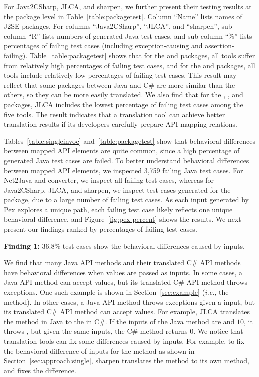 For Java2CSharp, JLCA, and sharpen, we further present their testing results at the package level in Table~\ref{table:packagetest}. Column ``Name'' lists names of J2SE packages. For columns ``Java2CSharp'', ``JLCA'', and ``sharpen'', sub-column ``R'' lists numbers of generated Java test cases, and sub-column ``\%'' lists percentages of failing test cases (including exception-causing and assertion-failing). Table~\ref{table:packagetest} shows that for the  and  packages, all tools suffer from relatively high percentages of failing test cases, and for the  and  packages, all tools include relatively low percentages of failing test cases. This result may reflect that some packages between Java and C\# are more similar than the others, so they can be more easily translated. We also find that for the , , and  packages, JLCA includes the lowest percentage of failing test cases among the five tools. The result indicates that a translation tool can achieve better translation results if its developers carefully prepare API mapping relations.

Tables~\ref{table:singleinvoc} and~\ref{table:packagetest} show that behavioral differences between mapped API elements are quite common, since a high percentage of generated Java test cases are failed. To better understand behavioral differences between mapped API elements, we inspected 3,759 failing Java test cases. For Net2Java and converter, we inspect all failing test cases, whereas for Java2CSharp, JLCA, and sharpen, we inspect test cases generated for the  package, due to a large number of failing test cases. As each input generated by Pex explores a unique path, each failing test case likely reflects one unique behavioral difference, and Figure~\ref{fig:pex-percent} shows the results. We next present our findings ranked by percentages of failing test cases.


\textbf{Finding 1:} 36.8\% test cases show the behavioral differences caused by  inputs.

We find that many Java API methods and their translated C\# API methods have behavioral differences when  values are passed as inputs. In some cases, a Java API method can accept  values, but its translated C\# API method throws exceptions. One such example is shown in Section~\ref{sec:example} (\emph{i.e.}, the  method). In other cases, a Java API method throws exceptions given a  input, but its translated C\# API method can accept  values. For example, JLCA translates the  method in Java to the  in C\#. If the inputs of the Java method are  and $10$, it throws , but given the same inputs, the C\# method returns 0. We notice that translation tools can fix some differences caused by  inputs. For example, to fix the behavioral difference of  inputs for the  method as shown in Section~\ref{sec:approach:single}, sharpen translates the method to its own method, and fixes the difference.

